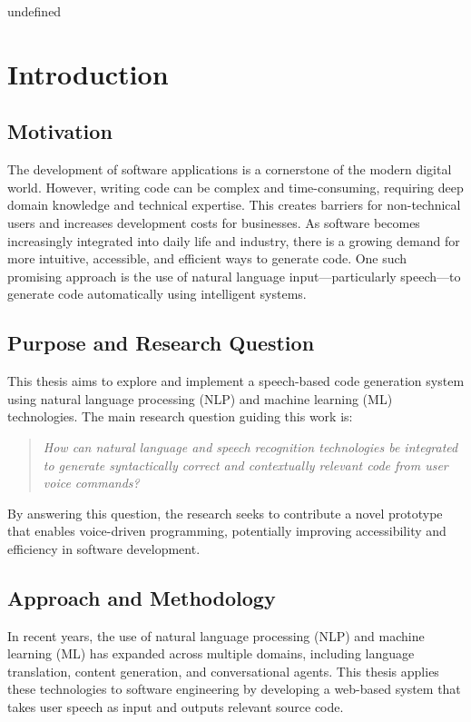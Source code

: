 undefined
\chapter{Introduction}

\section{Motivation}

The development of software applications is a cornerstone of the modern digital world. However, writing code can be complex and time-consuming, requiring deep domain knowledge and technical expertise. This creates barriers for non-technical users and increases development costs for businesses. As software becomes increasingly integrated into daily life and industry, there is a growing demand for more intuitive, accessible, and efficient ways to generate code. One such promising approach is the use of natural language input—particularly speech—to generate code automatically using intelligent systems.

\section{Purpose and Research Question}

This thesis aims to explore and implement a speech-based code generation system using natural language processing (NLP) and machine learning (ML) technologies. The main research question guiding this work is:

\begin{quote}
\textit{How can natural language and speech recognition technologies be integrated to generate syntactically correct and contextually relevant code from user voice commands?}
\end{quote}

By answering this question, the research seeks to contribute a novel prototype that enables voice-driven programming, potentially improving accessibility and efficiency in software development.

\section{Approach and Methodology}

In recent years, the use of natural language processing (NLP) and machine learning (ML) has expanded across multiple domains, including language translation, content generation, and conversational agents. This thesis applies these technologies to software engineering by developing a web-based system that takes user speech as input and outputs relevant source code.

